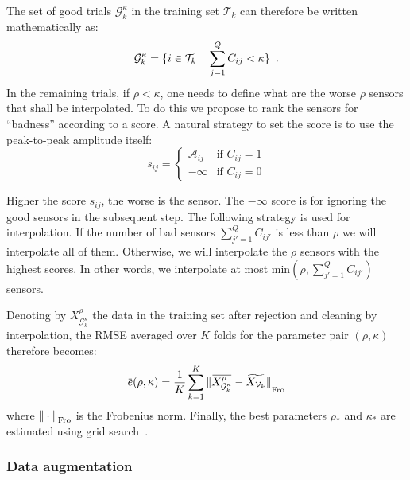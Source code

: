 The set of good trials $\mathcal{G}^{\kappa}_k$ in the training set $\mathcal{T}_k$ can therefore be written mathematically as:
%
\begin{equation}
\mathcal{G}^{\kappa}_{k} = \{i \in \mathcal{T}_k \, \mid \, \sum_{j=1}^{Q} C_{ij} < \kappa \} \enspace .
\end{equation}
%
In the remaining trials, if $\rho < \kappa$, one needs to define what are the worse $\rho$ sensors that shall be interpolated. To do this we propose to rank the sensors for ``badness'' according to a score. A natural strategy to set the score is to use the peak-to-peak amplitude itself:
%
\begin{equation}
s_{ij} = \begin{cases}
\mathcal{A}_{ij} & \text{if } C_{ij} = 1 \\
-\infty & \text{if } C_{ij} = 0
\end{cases}
\label{eq:score}
\end{equation}

Higher the score $s_{ij}$, the worse is the sensor. The $-\infty$ score is for ignoring the good sensors in the subsequent step. The following strategy is used for interpolation.
%
%
If the number of bad sensors $\sum_{j'=1}^{Q} C_{ij'}$ is less than $\rho$ we will interpolate all of them. Otherwise, we will interpolate the $\rho$ sensors with the highest scores.
In other words, we interpolate at most $\mathrm{min}(\rho, \sum_{j'=1}^{Q} C_{ij'})$ sensors.
%
%
%
%
%
%
%
%
%
%
%

Denoting by $X^{\rho}_{\mathcal{G}^{\kappa}_k}$ the data in the training set after rejection and cleaning by interpolation, the RMSE averaged over $K$ folds for the parameter pair $(\rho, \kappa)$ therefore becomes:
%
\begin{equation}
\overbar{e}(\rho, \kappa) = \frac{1}{K} \sum_{k=1}^{K} \fro{\overbar{X^{\rho}_{\mathcal{G}^{\kappa}_k}} - \widetilde{X_{\mathcal{V}_k}}}
\end{equation}
where ${\| \cdot \|}_{\mathrm{Fro}}$ is the Frobenius norm.
Finally, the best parameters $\rho_{*}$ and $\kappa_{*}$ are estimated using grid search~\citep{hsu2003practical}.
%

\subsubsection{Data augmentation}
\label{sec:data_augmentation}

